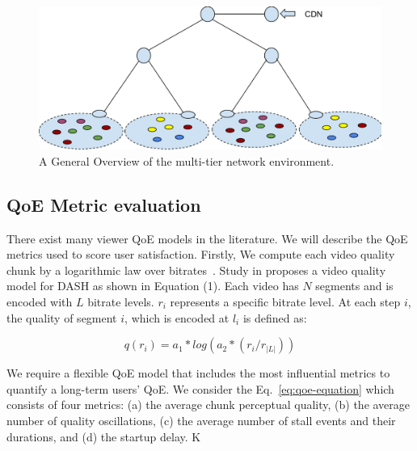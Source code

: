 \begin{figure}
    \centering
    \includegraphics[width=0.9\linewidth]{images/exp-setup-scenario.pdf}
    \caption{A General Overview of the multi-tier network environment.}
    \label{fig:exp-setup-scenario}
\end{figure}



\subsection{QoE Metric evaluation}

There exist many viewer QoE models in the literature. We will describe the QoE metrics used to score user satisfaction. Firstly, We compute each video quality chunk by a logarithmic law over bitrates~\cite{Reichl:TSys2013}. Study in proposes a video quality model for DASH as shown in Equation (1). Each video has $N$ segments and is encoded with $L$ bitrate levels. $r_i$ represents a specific bitrate level. At each step $i$, the quality of segment $i$, which is encoded at $l_i$ is defined as:

$$
q(r_i) = a_1 * log(a_2 * (r_i/ r_{|L|}))
$$

We require a flexible QoE model that includes the most influential metrics to quantify a long-term users' QoE. 
We consider the Eq.~\ref{eq:qoe-equation} which consists of four metrics: (a) the average chunk perceptual quality, (b) the average number of quality oscillations, (c) the average number of stall events and their durations, and (d) the startup delay. K

